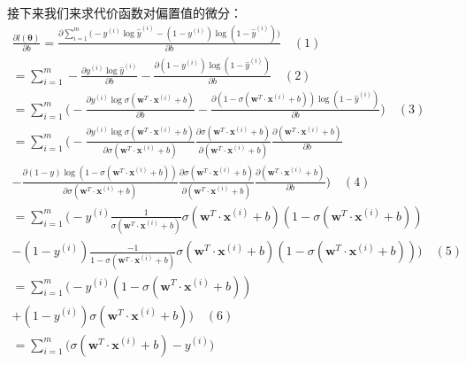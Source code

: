 \documentclass[UTF8]{article}
\begin{document}
接下来我们来求代价函数对偏置值的微分：
\begin{equation}
\begin{aligned}
\frac{ \partial{l(\boldsymbol{\theta})} } { \partial{b} } = \frac{ \partial{ \sum_{i=1}^{m} \Big( -y^{(i)} \log \hat{y}^{(i)} - (1-y^{(i)})\log(1 - \hat{y}^{(i)}) \Big) } } { \partial{b} } \quad (1) \\
=\sum_{i=1}^{m} -\frac{\partial{y^{(i)} \log \hat{y}^{(i)}}}{ \partial{b}} - \frac{\partial{ (1-y^{(i)})\log(1 - \hat{y}^{(i)}) }}{ \partial{b}} \quad (2) \\
= \sum_{i=1}^{m} \bigg(-\frac{\partial{y^{(i)} \log \sigma(\boldsymbol{w}^{T} \cdot \boldsymbol{x}^{(i)} + b) }}{ \partial{b}}- \frac{\partial{ (1- \sigma(\boldsymbol{w}^{T} \cdot \boldsymbol{x}^{(i)} + b))\log(1 - \hat{y}^{(i)}) }}{ \partial{b}} \bigg) \quad (3) \\
= \sum_{i=1}^{m} \bigg(-\frac{\partial{y^{(i)} \log \sigma(\boldsymbol{w}^{T} \cdot \boldsymbol{x}^{(i)} + b) }}{\partial{\sigma(\boldsymbol{w}^{T} \cdot \boldsymbol{x}^{(i)} + b)}} \frac{\partial{\sigma(\boldsymbol{w}^{T} \cdot \boldsymbol{x}^{(i)} + b)}}{\partial{(\boldsymbol{w}^{T} \cdot \boldsymbol{x}^{(i)} + b)}}  \frac{\partial{(\boldsymbol{w}^{T} \cdot \boldsymbol{x}^{(i)} + b)}}{ \partial{b}} \\
- \frac{\partial{ (1- y)\log(1 - \sigma(\boldsymbol{w}^{T} \cdot \boldsymbol{x}^{(i)} + b)) }}{\partial{\sigma(\boldsymbol{w}^{T} \cdot \boldsymbol{x}^{(i)} + b)}} \frac{\partial{\sigma(\boldsymbol{w}^{T} \cdot \boldsymbol{x}^{(i)} + b)}}{\partial{(\boldsymbol{w}^{T} \cdot \boldsymbol{x}^{(i)} + b)}}  \frac{\partial{(\boldsymbol{w}^{T} \cdot \boldsymbol{x}^{(i)} + b)}}{ \partial{b}} \bigg) \quad (4) \\
= \sum_{i=1}^{m} \Big( -y^{(i)}\frac{1}{\sigma(\boldsymbol{w}^{T} \cdot \boldsymbol{x}^{(i)} + b)}\sigma(\boldsymbol{w}^{T} \cdot \boldsymbol{x}^{(i)} + b)(1-\sigma(\boldsymbol{w}^{T} \cdot \boldsymbol{x}^{(i)} + b)) \\
- (1-y^{(i)})\frac{-1}{1 - \sigma(\boldsymbol{w}^{T} \cdot \boldsymbol{x}^{(i)} + b)}\sigma(\boldsymbol{w}^{T} \cdot \boldsymbol{x}^{(i)} + b)(1-\sigma(\boldsymbol{w}^{T} \cdot \boldsymbol{x}^{(i)} + b)) \Big) \quad (5)\\
= \sum_{i=1}^{m} \Big( -y^{(i)}(1-\sigma(\boldsymbol{w}^{T} \cdot \boldsymbol{x}^{(i)} + b)) \\
+(1-y^{(i)})\sigma(\boldsymbol{w}^{T} \cdot \boldsymbol{x}^{(i)} + b)  \Big) \quad (6) \\
= \sum_{i=1}^{m} \Big( \sigma(\boldsymbol{w}^{T} \cdot \boldsymbol{x}^{(i)} + b) - y^{(i)} \Big)
\end{aligned}
\label{lcrn-nll-vs-b-gradient}
\end{equation}
\end{document}
